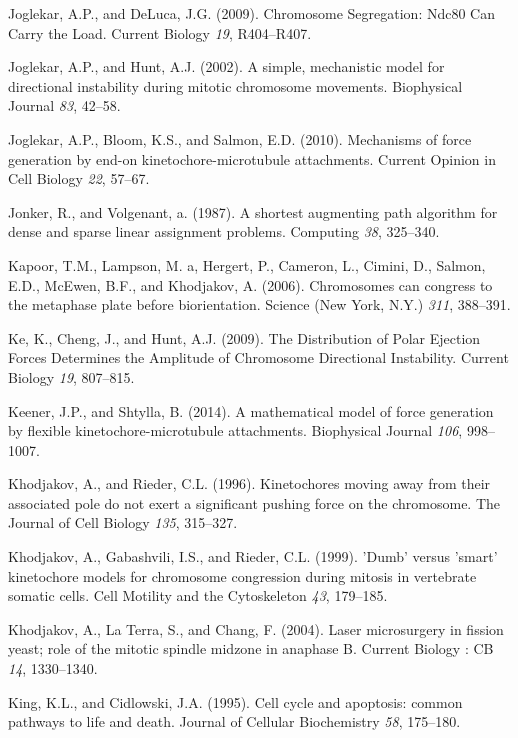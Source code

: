 \documentclass[12pt,a4paper,twoside,openright]{book}
\begin{document}
\hypertarget{ref-Joglekar2009}{}
Joglekar, A.P., and DeLuca, J.G. (2009). Chromosome Segregation: Ndc80
Can Carry the Load. Current Biology \emph{19}, R404--R407.

\hypertarget{ref-Joglekar2002}{}
Joglekar, A.P., and Hunt, A.J. (2002). A simple, mechanistic model for
directional instability during mitotic chromosome movements. Biophysical
Journal \emph{83}, 42--58.

\hypertarget{ref-Joglekar2010a}{}
Joglekar, A.P., Bloom, K.S., and Salmon, E.D. (2010). Mechanisms of
force generation by end-on kinetochore-microtubule attachments. Current
Opinion in Cell Biology \emph{22}, 57--67.

\hypertarget{ref-Jonker1987}{}
Jonker, R., and Volgenant, a. (1987). A shortest augmenting path
algorithm for dense and sparse linear assignment problems. Computing
\emph{38}, 325--340.

\hypertarget{ref-Kapoor2006}{}
Kapoor, T.M., Lampson, M. a, Hergert, P., Cameron, L., Cimini, D.,
Salmon, E.D., McEwen, B.F., and Khodjakov, A. (2006). Chromosomes can
congress to the metaphase plate before biorientation. Science (New York,
N.Y.) \emph{311}, 388--391.

\hypertarget{ref-Ke2009}{}
Ke, K., Cheng, J., and Hunt, A.J. (2009). The Distribution of Polar
Ejection Forces Determines the Amplitude of Chromosome Directional
Instability. Current Biology \emph{19}, 807--815.

\hypertarget{ref-Keener2014}{}
Keener, J.P., and Shtylla, B. (2014). A mathematical model of force
generation by flexible kinetochore-microtubule attachments. Biophysical
Journal \emph{106}, 998--1007.

\hypertarget{ref-Khodjakov1996}{}
Khodjakov, A., and Rieder, C.L. (1996). Kinetochores moving away from
their associated pole do not exert a significant pushing force on the
chromosome. The Journal of Cell Biology \emph{135}, 315--327.

\hypertarget{ref-Khodjakov1999}{}
Khodjakov, A., Gabashvili, I.S., and Rieder, C.L. (1999). 'Dumb' versus
'smart' kinetochore models for chromosome congression during mitosis in
vertebrate somatic cells. Cell Motility and the Cytoskeleton \emph{43},
179--185.

\hypertarget{ref-Khodjakov2004}{}
Khodjakov, A., La Terra, S., and Chang, F. (2004). Laser microsurgery in
fission yeast; role of the mitotic spindle midzone in anaphase B.
Current Biology : CB \emph{14}, 1330--1340.

\hypertarget{ref-King1995}{}
King, K.L., and Cidlowski, J.A. (1995). Cell cycle and apoptosis: common
pathways to life and death. Journal of Cellular Biochemistry \emph{58},
175--180.
\end{document}
